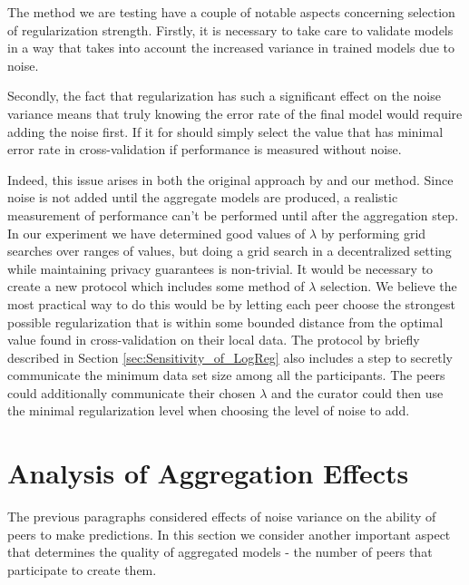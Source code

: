The method we are testing have a couple of notable aspects concerning selection of regularization strength. Firstly, it is necessary to take care to validate models in a way that takes into account the increased variance in trained models due to noise.

Secondly, the fact that regularization has such a significant effect on the noise variance means that truly knowing the error rate of the final model would require adding the noise first.  If it for should simply select the value that has minimal error rate in cross-validation if performance is measured without noise. 

Indeed, this issue arises in both the original approach by \cite{pathak2010diffprivhomo} and our method. Since noise is not added until the aggregate models are produced, a realistic measurement of performance can't be performed until after the aggregation step. In our experiment we have determined good values of $\lambda$ by performing grid searches over ranges of values, but doing a grid search in a decentralized setting while maintaining privacy guarantees is non-trivial. It would be necessary to create a new protocol which includes some method of $\lambda$ selection. We believe the most practical way to do this would be by letting each peer choose the strongest possible regularization that is within some bounded distance from the optimal value found in cross-validation on their local data. The protocol by \cite{pathak2010diffprivhomo} briefly described in Section \ref{sec:Sensitivity_of_LogReg} also includes a step to secretly communicate the minimum data set size among all the participants. The peers could additionally communicate their chosen $\lambda$ and the curator could then use the minimal regularization level when choosing the level of noise to add.

\section{Analysis of Aggregation Effects}
\label{sec:aggregation_effects}

The previous paragraphs considered effects of noise variance on the ability of peers to make predictions. In this section we consider another important aspect that determines the quality of aggregated models - the number of peers that participate to create them. 

